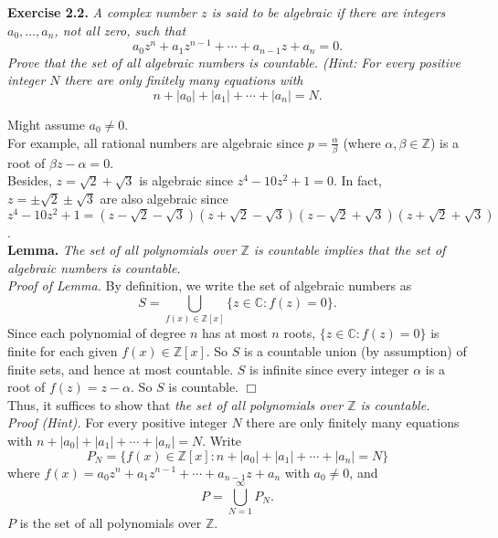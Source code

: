 \documentclass{article}
\begin{document}



\textbf{Exercise 2.2.}
\emph{A complex number $z$ is said to be algebraic if there are integers
$a_0, \ldots, a_n$, not all zero, such that
$$a_0 z^n + a_1 z^{n-1} + \cdots + a_{n-1} z + a_n = 0.$$
Prove that the set of all algebraic numbers is countable.
(Hint: For every positive integer $N$ there are only finitely many equations with
$$n + |a_0| + |a_1| + \cdots + |a_n| = N.$$}

Might assume $a_0 \neq 0$. \\

For example, all rational numbers are algebraic
since $p = \frac{\alpha}{\beta}$ (where $\alpha, \beta \in \mathbb{Z}$)
is a root of $\beta z - \alpha = 0$. \\

Besides, $z = \sqrt{2} + \sqrt{3}$ is algebraic since $z^4 - 10z^2 + 1 = 0$.
In fact, $z = \pm\sqrt{2} \pm\sqrt{3}$ are also algebraic since
$z^4 - 10z^2 + 1 =
(z - \sqrt{2} - \sqrt{3})(z + \sqrt{2} - \sqrt{3})
(z - \sqrt{2} + \sqrt{3})(z + \sqrt{2} + \sqrt{3})$. \\

\textbf{Lemma.}
\emph{The set of all polynomials over $\mathbb{Z}$ is countable implies that
the set of algebraic numbers is countable.} \\

\emph{Proof of Lemma.}
By definition, we write the set of algebraic numbers as
$$S = \bigcup_{f(x) \in \mathbb{Z}[x]} \{ z \in \mathbb{C} : f(z) = 0 \}.$$
Since each polynomial of degree $n$ has at most $n$ roots,
$\{ z \in \mathbb{C} : f(z) = 0 \}$ is finite for each given $f(x) \in \mathbb{Z}[x]$.
So $S$ is a countable union (by assumption) of finite sets, and hence at most countable.
$S$ is infinite since every integer $\alpha$ is a root of $f(z) = z - \alpha$.
So $S$ is countable.
$\Box$ \\

Thus, it suffices to show that
\emph{the set of all polynomials over $\mathbb{Z}$ is countable.} \\

\emph{Proof (Hint).}
For every positive integer $N$ there are only finitely many equations with
$n + |a_0| + |a_1| + \cdots + |a_n| = N.$
Write
$$P_N = \{ f(x) \in \mathbb{Z}[x] : n + |a_0| + |a_1| + \cdots + |a_n| = N \}$$
where $f(x) = a_0 z^n + a_1 z^{n-1} + \cdots + a_{n-1} z + a_n$ with $a_0 \neq 0$,
and
$$P = \bigcup_{N = 1}^{\infty} P_N.$$
$P$ is the set of all polynomials over $\mathbb{Z}$. \\
\end{document}
